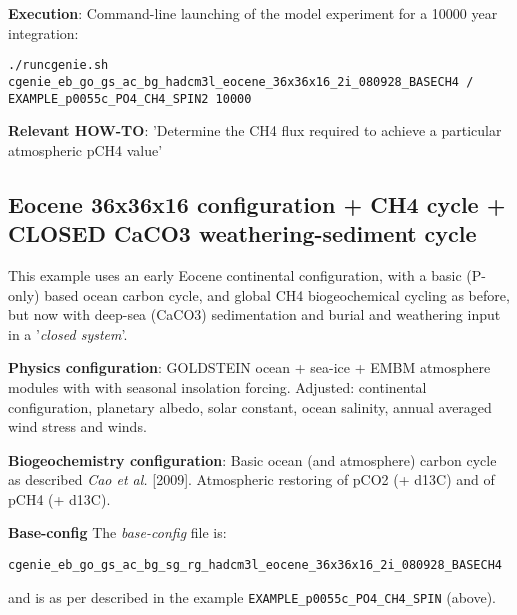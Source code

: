 \documentclass[10pt,twoside]{article}
\begin{document}
\noindent \textbf{Execution}: Command-line launching of the model experiment for a 10000 year integration:
\vspace{-10pt}\begin{verbatim}./runcgenie.sh cgenie_eb_go_gs_ac_bg_hadcm3l_eocene_36x36x16_2i_080928_BASECH4 /
EXAMPLE_p0055c_PO4_CH4_SPIN2 10000\end{verbatim}\vspace{-5pt}

\noindent \textbf{Relevant HOW-TO}: 'Determine the CH4 flux required to achieve a particular atmospheric pCH4 value'



\subsection{Eocene 36x36x16 configuration + CH4 cycle + CLOSED CaCO3 weathering-sediment cycle}\label{EXAMPLE_p0055c_PO4_CH4_S72x72_SPIN}

This example uses an early Eocene continental configuration, with a basic (P-only) based ocean carbon cycle, and global CH4 biogeochemical cycling as before, but now with deep-sea (CaCO3) sedimentation and burial and weathering input in a '\textit{closed system}'.

\noindent \textbf{Physics configuration}: GOLDSTEIN ocean + sea-ice + EMBM atmosphere modules with with seasonal insolation forcing. Adjusted: continental configuration, planetary albedo, solar constant, ocean salinity, annual averaged wind stress and winds.

\noindent \textbf{Biogeochemistry configuration}: Basic ocean (and atmosphere) carbon cycle as described \textit{Cao et al.} [2009]. Atmospheric restoring of pCO2 (+ d13C) and of pCH4 (+ d13C).

\noindent \textbf{Base-config} The \textit{base-config} file is:
\vspace{-10pt}\begin{verbatim}cgenie_eb_go_gs_ac_bg_sg_rg_hadcm3l_eocene_36x36x16_2i_080928_BASECH4 \end{verbatim}\vspace{-10pt}
and is as per described in the example \texttt{EXAMPLE\_p0055c\_PO4\_CH4\_SPIN} (above).
\end{document}
